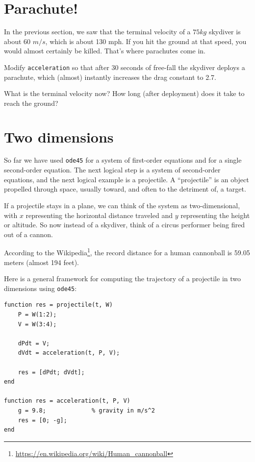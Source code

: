 \documentclass{book}
\begin{document}
\section{Parachute!}

In the previous section, we saw that the terminal velocity of a $75
kg$ skydiver is about 60 $m/s$, which is about 130 mph.  If you hit
the ground at that speed, you would almost certainly be killed.
That's where parachutes come in.

\begin{ex}
Modify {\tt acceleration} so that after 30 seconds of
free-fall the skydiver deploys a parachute, which (almost) instantly
increases the drag constant to 2.7.

What is the terminal velocity now?  How long (after deployment) does
it take to reach the ground?
\end{ex}


\section{Two dimensions}
\label{projectile}

So far we have used {\tt ode45} for a system of first-order
equations and for a single second-order equation.  The next logical
step is a system of second-order equations, and the next logical example
is a projectile.  A ``projectile'' is an object propelled
through space, usually toward, 
and often to the detriment of,
a target.

If a projectile stays in a plane, we can think of the system as
two-dimensional, with $x$ representing the horizontal distance
traveled and $y$ representing the height or altitude.  So now
instead of a skydiver, think of a circus performer being fired
out of a cannon.

According to the
Wikipedia\footnote{\url{https://en.wikipedia.org/wiki/Human_cannonball}},
the record distance for a human cannonball is 59.05 meters (almost 194
feet).

Here is a general framework for computing the trajectory of a projectile
in two dimensions using {\tt ode45}:

\begin{verbatim}
function res = projectile(t, W)
    P = W(1:2);
    V = W(3:4);

    dPdt = V;                          
    dVdt = acceleration(t, P, V);

    res = [dPdt; dVdt];
end

function res = acceleration(t, P, V)
    g = 9.8;             % gravity in m/s^2
    res = [0; -g];
end
\end{verbatim}
\end{document}

